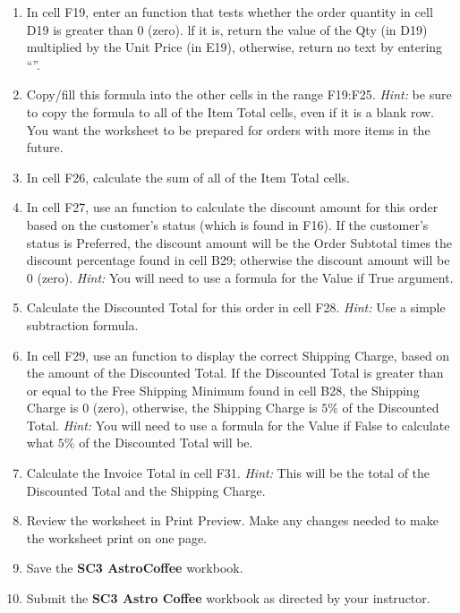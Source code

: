 \begin{enumerate}
\item In cell \textsf{F19}, enter an  function that tests whether the order quantity in cell \textsf{D19} is greater than $ 0 $ (zero). lf it is, return the value of the Qty (in \textsf{D19}) multiplied by the Unit Price (in \textsf{E19}), otherwise, return no text by entering ``''.
\item Copy/fill this formula into the other cells in the range \textsf{F19:F25}. \textit{Hint:} be sure to copy the formula to all of the Item Total cells, even if it is a blank row. You want the worksheet to be prepared for orders with more items in the future.
\item In cell \textsf{F26}, calculate the sum of all of the Item Total cells.
\item In cell \textsf{F27}, use an  function to calculate the discount amount for this order based on the customer's status (which is found in \textsf{F16}). If the customer's status is Preferred, the discount amount will be the Order Subtotal times the discount percentage found in cell \textsf{B29}; otherwise the discount amount will be $ 0 $ (zero). \textit{Hint:} You will need to use a formula for the Value if True argument.
\item Calculate the Discounted Total for this order in cell \textsf{F28}. \textit{Hint:} Use a simple subtraction formula.
\item In cell \textsf{F29}, use an  function to display the correct Shipping Charge, based on the amount of the Discounted Total. If the Discounted Total is greater than or equal to the Free Shipping Minimum found in cell \textsf{B28}, the Shipping Charge is $ 0 $ (zero), otherwise, the Shipping Charge is $ 5\% $ of the Discounted Total. \textit{Hint:} You will need to use a formula for the Value if False to calculate what $ 5\% $ of the Discounted Total will be.
\item Calculate the Invoice Total in cell \textsf{F31}. \textit{Hint:} This will be the total of the Discounted Total and the Shipping Charge.
\item Review the worksheet in Print Preview. Make any changes needed to make the worksheet print on one page.
\item Save the \textbf{SC3 AstroCoffee} workbook.
\item Submit the \textbf{SC3 Astro Coffee} workbook as directed by your instructor.
\end{enumerate}
